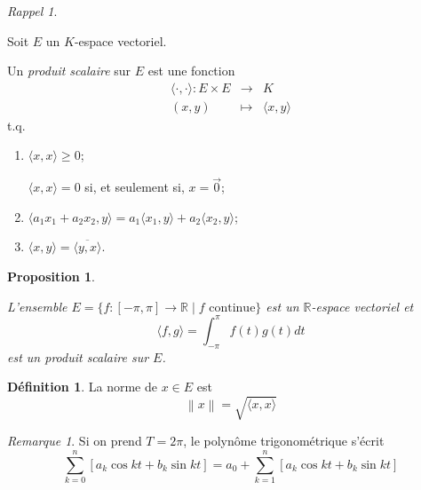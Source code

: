 \documentclass{report}
\newcommand*{\dsum}[4]{\displaystyle\sum_{#1=#2}^{#3}#4}
\newcommand*{\dint}[3]{\displaystyle\int_{#1}^{#2}#3}
\newcommand*{\norme}[1]{\left\| #1 \right\|}
\newcommand*{\gte}{\geqslant}
\newcommand*{\reels}{\mathbb{R}}
\newtheorem*{prop}{Proposition}
\theoremstyle{definition}
\newtheorem*{defin}{D\'efinition}
\theoremstyle{remark}
\newtheorem*{rema}{Remarque}
\newtheorem*{rapp}{Rappel}
\begin{document}
	\begin{rapp}~

		Soit $E$ un $K$-espace vectoriel.

		Un \emph{produit scalaire} sur $E$ est une fonction
		\begin{equation*}
			\begin{array}{rcl}
				\langle \cdot , \cdot \rangle:E \times E&\to&K\\
				(x,y)&\mapsto&\langle x,y \rangle
			\end{array}
		\end{equation*}
		t.q.
		\begin{enumerate}[label=\roman*)]
			\item $\langle x,x \rangle \gte 0$;

			$\langle x,x \rangle = 0$ si, et seulement si, $x=\vec{0}$;
			\item $\langle a_1x_1+a_2x_2, y \rangle = a_1 \langle x_1,y \rangle + a_2 \langle x_2,y \rangle$;
			\item $\langle x,y \rangle = \overline{\langle y,x \rangle}$.
		\end{enumerate}
	\end{rapp}
	\begin{prop}~

		L'ensemble $E=\{f:[-\pi,\pi]\to\reels \mid f \text{ continue}\}$ est un $\reels$-espace vectoriel et
		\begin{equation*}
			\langle f,g \rangle = \dint{-\pi}{\pi}{f(t)g(t) dt}
		\end{equation*}
		est un produit scalaire sur $E$.
	\end{prop}
	\begin{defin}
		La norme de $x \in E$ est
		\begin{equation*}
			\norme{x} = \sqrt{\langle x,x \rangle}
		\end{equation*}
	\end{defin}
	\begin{rema}
		Si on prend $T=2\pi$, le polyn\^ome trigonom\'etrique s'\'ecrit
		\begin{equation*}
			\dsum{k}{0}{n}{\left[ a_k\cos kt + b_k\sin kt \right]} = a_0 + \dsum{k}{1}{n}{\left[ a_k\cos kt + b_k\sin kt \right]}
		\end{equation*}
	\end{rema}
\end{document}
